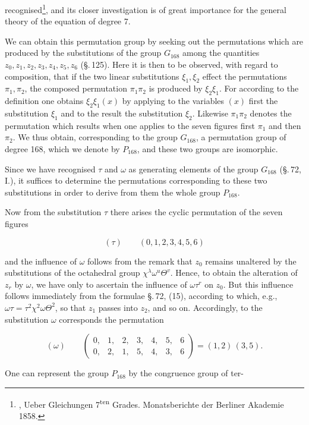  recognised\footnote{, \glqq Ueber Gleichungen 7\textsuperscript{ten} Grades\grqq{}. Monatsberichte der Berliner Akademie 1858.}, and its closer investigation is of great importance for the general theory of the equation of degree 7.

We can obtain this permutation group by seeking out the permutations which are produced by the substitutions of the group $G_{168}$ among the quantities $z_0, z_1, z_2, z_3, z_4, z_5, z_6$ (\S.\,125). Here it is then to be observed, with regard to composition, that if the two linear substitutions $\xi_1, \xi_2$ effect the permutations $\pi_1, \pi_2$, the composed permutation $\pi_1 \pi_2$ is produced by $\xi_2 \xi_1$. For according to the definition one obtains $\xi_2 \xi_1 (x)$ by applying to the variables $(x)$ first the substitution $\xi_1$ and to the result the substitution $\xi_2$. Likewise $\pi_1 \pi_2$ denotes the permutation which results when one applies to the seven figures first $\pi_1$ and then $\pi_2$. We thus obtain, corresponding to the group $G_{168}$, a permutation group of degree 168, which we denote by $P_{168}$, and these two groups are isomorphic.

Since we have recognised $\tau$ and $\omega$ as generating elements of the group $G_{168}$ (\S.\,72, I.), it suffices to determine the permutations corresponding to these two substitutions in order to derive from them the whole group $P_{168}$.

Now from the substitution $\tau$ there arises the cyclic permutation of the seven figures

\[
(\tau) \qquad (0, 1, 2, 3, 4, 5, 6)
\]

and the influence of $\omega$ follows from the remark that $z_0$ remains unaltered by the substitutions of the octahedral group $\chi^\lambda \omega^u \Theta^v$. Hence, to obtain the alteration of $z_r$ by $\omega$, we have only to ascertain the influence of $\omega \tau^r$ on $z_0$. But this influence follows immediately from the formulae \S.\,72, (15), according to which, e.g., $\omega \tau = \tau^2 \chi^2 \omega \Theta^2$, so that $z_1$ passes into $z_2$, and so on. Accordingly, to the substitution $\omega$ corresponds the permutation

\[
(\omega) \qquad \begin{pmatrix} 0, & 1, & 2, & 3, & 4, & 5, & 6 \\ 0, & 2, & 1, & 5, & 4, & 3, & 6 \end{pmatrix} = (1, 2)\,(3, 5).
\]

One can represent the group $P_{168}$ by the congruence group of ter-
